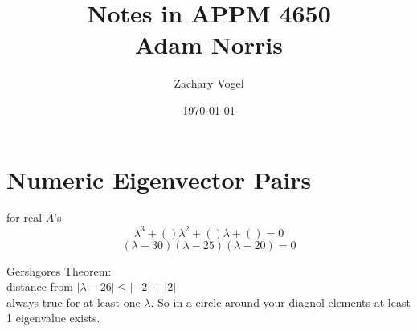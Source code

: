 \documentclass{article}
\begin{document}
\author{Zachary Vogel}
\date{\today}
\title{Notes in APPM 4650\\Adam Norris}

\maketitle



\section{Numeric Eigenvector Pairs}
for real $A$'s\\
\[\lambda^3+()\lambda^2+()\lambda+()=0\]
\[(\lambda-30)(\lambda-25)(\lambda-20)=0\]

Gershgores Theorem:\\
distance from $\lvert \lambda-26\rvert\leq \lvert -2\rvert+\lvert 2\rvert$\\
always true for at least one $\lambda$. So in a circle around your diagnol elements at least 1 eigenvalue exists.\\
\end{document}
